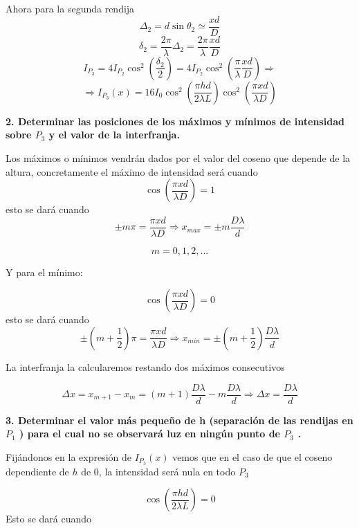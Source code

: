 \documentclass[a4paper,12pt,spanish]{article}
\begin{document}
Ahora para la segunda rendija
\[\Delta_2 = d \sin\theta_2  \simeq \frac{xd }{D}
\]
\[ \delta_2 = \frac{2 \pi}{\lambda} \Delta_2 = \frac{2 \pi}{\lambda} \frac{xd }{D}
\]
\[I_{P_3} = 4 I_{P_2} \cos^2(\frac{\delta_2}{2}) = 4 I_{P_2} \cos^2(\frac{ \pi}{\lambda} \frac{xd }{D})  \Rightarrow
 \]
 \[  \Rightarrow \boxed{I_{P_3}(x) = 16   I_0 \cos^2\left(\frac{\pi hd}{2\lambda L}\right)   \cos^2\left(\frac{\pi xd }{\lambda D}\right) }
 \]

\vspace{\baselineskip}
\vspace{\baselineskip}


\textbf{ 2. Determinar las posiciones de los máximos y mínimos de intensidad sobre $P_3$ y el valor de la interfranja.
}
\vspace{\baselineskip}


Los máximos o mínimos vendrán dados por el valor del coseno que depende de la altura, concretamente el máximo de intensidad será cuando
\[ \cos\left( \frac{\pi xd }{\lambda D} \right) = 1 
\]
 esto se dará cuando 
 \[ \pm m \pi  =  \frac{\pi xd }{\lambda D} \Longrightarrow \boxed{ x_{max} = \pm m \frac{D \lambda}{d} }
 \]

\[ m = 0, 1, 2, ...
\]

Y para el mínimo:

\[ \cos\left( \frac{\pi xd }{\lambda D} \right) = 0
\]
esto se dará cuando 
\[ \pm (m+\frac{1}{2}) \pi  =  \frac{\pi xd }{\lambda D} \Longrightarrow \boxed{ x_{min} = \pm (m+\frac{1}{2}) \frac{D \lambda}{d} }
\]

La interfranja la calcularemos restando dos máximos consecutivos

\[ \Delta x = x_{m+1} - x_{m} = (m+1) \frac{D \lambda}{d} -  m \frac{D \lambda}{d} \Longrightarrow \boxed{ \Delta x = \frac{D \lambda}{d} }
\]

\vspace{\baselineskip}


\textbf{ 3. Determinar el valor más pequeño de h (separación de las rendijas en $P_1$ ) para el cual no se observará luz en ningún punto de $P_3$ .
}
\vspace{\baselineskip}

Fijándonos en la expresión de $I_{P_3} (x)$ vemos que en el caso de que el coseno dependiente de $h$ de 0, la intensidad será nula en todo $P_3$

\[ \cos\left(\frac{\pi hd}{2\lambda L}\right) = 0
\]
Esto se dará cuando 
\end{document}
